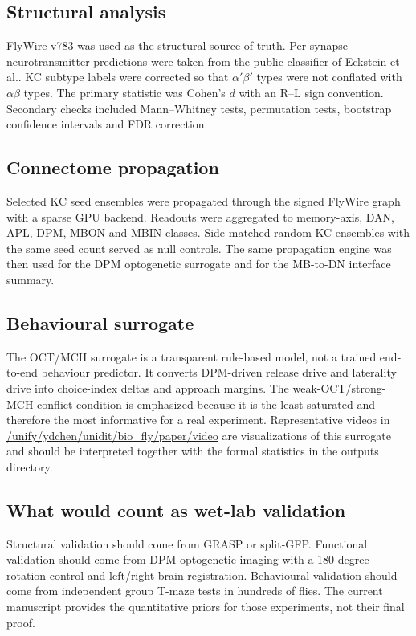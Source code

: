 \documentclass[10pt]{article}
\begin{document}
\subsection*{Structural analysis}
FlyWire v783 was used as the structural source of truth\cite{dorkenwald2024flywire,schlegel2024flywire}. Per-synapse neurotransmitter predictions were taken from the public classifier of Eckstein et al.\cite{eckstein2020neurotransmitter}. KC subtype labels were corrected so that $\alpha'\beta'$ types were not conflated with $\alpha\beta$ types. The primary statistic was Cohen's $d$ with an R--L sign convention. Secondary checks included Mann--Whitney tests, permutation tests, bootstrap confidence intervals and FDR correction.

\subsection*{Connectome propagation}
Selected KC seed ensembles were propagated through the signed FlyWire graph with a sparse GPU backend. Readouts were aggregated to memory-axis, DAN, APL, DPM, MBON and MBIN classes. Side-matched random KC ensembles with the same seed count served as null controls. The same propagation engine was then used for the DPM optogenetic surrogate and for the MB-to-DN interface summary.

\subsection*{Behavioural surrogate}
The OCT/MCH surrogate is a transparent rule-based model, not a trained end-to-end behaviour predictor. It converts DPM-driven release drive and laterality drive into choice-index deltas and approach margins. The weak-OCT/strong-MCH conflict condition is emphasized because it is the least saturated and therefore the most informative for a real experiment. Representative videos in \url{/unify/ydchen/unidit/bio_fly/paper/video} are visualizations of this surrogate and should be interpreted together with the formal statistics in the outputs directory.

\subsection*{What would count as wet-lab validation}
Structural validation should come from GRASP or split-GFP. Functional validation should come from DPM optogenetic imaging with a 180-degree rotation control and left/right brain registration. Behavioural validation should come from independent group T-maze tests in hundreds of flies. The current manuscript provides the quantitative priors for those experiments, not their final proof.
\end{document}
